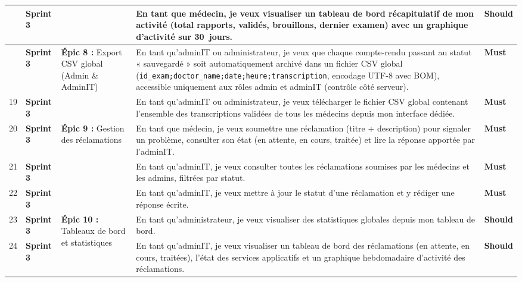 \documentclass[12pt,a4paper]{report}
\newcommand{\must}{\textcolor{must}{\textbf{Must}}}
\newcommand{\should}{\textcolor{should}{\textbf{Should}}}
\newcommand{\sprintthree}[1]{\cellcolor{sprint3bg}\textcolor{sprint3txt}{\textbf{#1}}}
\begin{document}
\begin{longtable}{
  |>{\centering\arraybackslash}p{0.7cm}
  |>{\centering\arraybackslash}p{2.2cm}
  |p{3.8cm}
  |p{6.8cm}
  |>{\centering\arraybackslash}p{1.4cm}|
}
17 & \sprintthree{Sprint 3} &
   & En tant que médecin, je veux visualiser un tableau de bord récapitulatif de mon activité (total rapports, validés, brouillons, dernier examen) avec un graphique d'activité sur 30~jours.
   & \should \\ \hline

18 & \sprintthree{Sprint 3}
   & \multirow{2}{3.8cm}{\textbf{Épic 8 :} Export CSV global (Admin \& AdminIT)}
   & En tant qu'adminIT ou administrateur, je veux que chaque compte-rendu passant au statut « sauvegardé » soit automatiquement archivé dans un fichier CSV global (\texttt{id\_exam;doctor\_name;date;heure;transcription}, encodage UTF-8 avec BOM), accessible uniquement aux rôles admin et adminIT (contrôle côté serveur).
   & \must \\ \cline{1-2}\cline{4-5}

19 & \sprintthree{Sprint 3} &
   & En tant qu'adminIT ou administrateur, je veux télécharger le fichier CSV global contenant l'ensemble des transcriptions validées de tous les médecins depuis mon interface dédiée.
   & \must \\ \hline

20 & \sprintthree{Sprint 3}
   & \multirow{3}{3.8cm}{\textbf{Épic 9 :} Gestion des réclamations}
   & En tant que médecin, je veux soumettre une réclamation (titre + description) pour signaler un problème, consulter son état (en attente, en cours, traitée) et lire la réponse apportée par l'adminIT.
   & \must \\ \cline{1-2}\cline{4-5}

21 & \sprintthree{Sprint 3} &
   & En tant qu'adminIT, je veux consulter toutes les réclamations soumises par les médecins et les admins, filtrées par statut.
   & \must \\ \cline{1-2}\cline{4-5}

22 & \sprintthree{Sprint 3} &
   & En tant qu'adminIT, je veux mettre à jour le statut d'une réclamation et y rédiger une réponse écrite.
   & \must \\ \hline

23 & \sprintthree{Sprint 3}
   & \multirow{2}{3.8cm}{\textbf{Épic 10 :} Tableaux de bord et statistiques}
   & En tant qu'administrateur, je veux visualiser des statistiques globales depuis mon tableau de bord.
   & \should \\ \cline{1-2}\cline{4-5}

24 & \sprintthree{Sprint 3} &
   & En tant qu'adminIT, je veux visualiser un tableau de bord des réclamations (en attente, en cours, traitées), l'état des services applicatifs et un graphique hebdomadaire d'activité des réclamations.
   & \should \\ \hline


\end{longtable}
\end{document}
